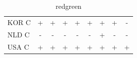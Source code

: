 \documentclass[12pt,bibliography=totoc]{article}
\begin{document}
\begin{table}[H]
\begin{tabular}{l  cccccccc}
KOR C	&\cellcolor{green!25}+	&\cellcolor{green!25}+	&\cellcolor{green!25}+	&\cellcolor{green!25}+	&\cellcolor{green!25}+	&\cellcolor{green!25}+	&\cellcolor{green!25}+	&\cellcolor{red!25}-     \\
NLD C	&\cellcolor{red!25}-	&\cellcolor{red!25}-	&\cellcolor{red!25}-	&\cellcolor{red!25}-	&\cellcolor{red!25}-	&\cellcolor{green!25}+	&\cellcolor{red!25}-	&\cellcolor{red!25}-     \\
USA C	&\cellcolor{green!25}+	&\cellcolor{green!25}+	&\cellcolor{green!25}+	&\cellcolor{green!25}+	&\cellcolor{green!25}+	&\cellcolor{green!25}+	&\cellcolor{green!25}+	&\cellcolor{green!25}+   \\

\hline            
\end{tabular}
\caption{redgreen} %
\end{table}














\end{document}
